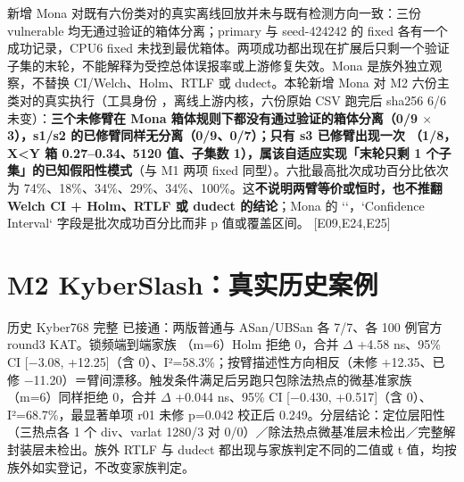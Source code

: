 \documentclass[UTF8,fontset=fandol,11pt,a4paper]{ctexart}
\begin{document}
新增 Mona 对既有六份类对的真实离线回放并未与既有检测方向一致：三份 vulnerable 均无通过验证的箱体分离；primary 与 seed-424242 的 fixed 各有一个成功记录，CPU6 fixed 未找到最优箱体。两项成功都出现在扩展后只剩一个验证子集的末轮，不能解释为受控总体误报率或上游修复失效。Mona 是族外独立观察，不替换 CI/Welch、Holm、RTLF 或 dudect。本轮新增 Mona 对 M2 六份主类对的真实执行（工具身份 \texttt{}，离线上游内核，六份原始 CSV 跑完后 sha256 6/6 未变）：\textbf{三个未修臂在 Mona 箱体规则下都没有通过验证的箱体分离（0/9 \texorpdfstring{$\times$}{x}3），s1/s2 的已修臂同样无分离（0/9、0/7）；只有 s3 已修臂出现一次 \texttt{}（1/8，X<Y 箱 0.27–0.34、5120 值、子集数 1），属该自适应实现「末轮只剩 1 个子集」的已知假阳性模式}（与 M1 两项 fixed 同型）。六批最高批次成功百分比依次为 74\%、18\%、34\%、29\%、34\%、100\%。这\textbf{不说明两臂等价或恒时，也不推翻 Welch CI + Holm、RTLF 或 dudect 的结论}；Mona 的 `\texttt{}`，`Confidence Interval` 字段是批次成功百分比而非 p 值或覆盖区间。 [E09,E24,E25]


\section{M2 KyberSlash：真实历史案例}
历史 Kyber768 完整 \texttt{} 已接通：两版普通与 ASan/UBSan 各 7/7、各 100 例官方 round3 KAT。锁频端到端家族 \texttt{}（m=6）Holm 拒绝 0，合并 \texorpdfstring{$\Delta$}{Delta} +4.58 ns、95\% CI [\texorpdfstring{$-$}{-}3.08, +12.25]（含 0）、I²=58.3\%；按臂描述性方向相反（未修 +12.35、已修 \texorpdfstring{$-$}{-}11.20）＝臂间漂移。触发条件满足后另跑只包除法热点的微基准家族 \texttt{}（m=6）同样拒绝 0，合并 \texorpdfstring{$\Delta$}{Delta} +0.044 ns、95\% CI [\texorpdfstring{$-$}{-}0.430, +0.517]（含 0）、I²=68.7\%，最显著单项 r01 未修 p=0.042 校正后 0.249。分层结论：定位层阳性（三热点各 1 个 div、varlat 1280/3 对 0/0）／除法热点微基准层未检出／完整解封装层未检出。族外 RTLF 与 dudect 都出现与家族判定不同的二值或 t 值，均按族外如实登记，不改变家族判定。
\end{document}

